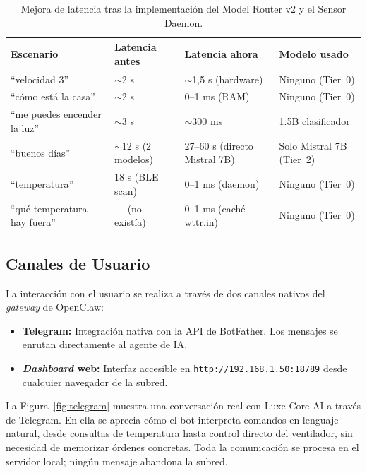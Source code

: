 \begin{table}[ht]
\centering
\small
\begin{tabular}{|p{3.4cm}|p{2.6cm}|p{4.0cm}|p{3.0cm}|}
\hline
\textbf{Escenario} & \textbf{Latencia antes} & \textbf{Latencia ahora} & \textbf{Modelo usado} \\
\hline
``velocidad 3'' & $\sim$2 s & $\sim$1,5 s (hardware) & Ninguno (Tier~0) \\
``cómo está la casa'' & $\sim$2 s & 0--1 ms (RAM) & Ninguno (Tier~0) \\
``me puedes encender la luz'' & $\sim$3 s & $\sim$300 ms & 1.5B clasificador \\
``buenos días'' & $\sim$12 s (2 modelos) & 27--60 s (directo Mistral 7B) & Solo Mistral 7B (Tier~2) \\
``temperatura'' & 18 s (BLE scan) & 0--1 ms (daemon) & Ninguno (Tier~0) \\
``qué temperatura hay fuera'' & --- (no existía) & 0--1 ms (caché wttr.in) & Ninguno (Tier~0) \\
\hline
\end{tabular}
\caption{Mejora de latencia tras la implementación del Model Router v2 y el Sensor Daemon.}
\label{tab:latencia_antes_despues}
\end{table}

\subsection{Canales de Usuario}

La interacción con el usuario se realiza a través de dos canales nativos del \textit{gateway} de OpenClaw:

\begin{itemize}
    \item \textbf{Telegram:} Integración nativa con la API de BotFather. Los mensajes se enrutan directamente al agente de IA.
    \item \textbf{\textit{Dashboard} web:} Interfaz accesible en \texttt{http://192.168.1.50:18789} desde cualquier navegador de la subred.
\end{itemize}

La Figura~\ref{fig:telegram} muestra una conversación real con Luxe Core AI a través de Telegram. En ella se aprecia cómo el bot interpreta comandos en lenguaje natural, desde consultas de temperatura hasta control directo del ventilador, sin necesidad de memorizar órdenes concretas. Toda la comunicación se procesa en el servidor local; ningún mensaje abandona la subred.

